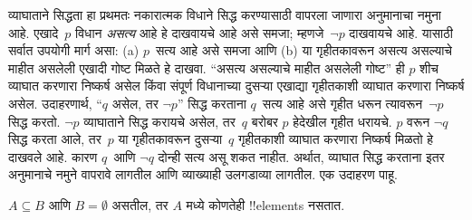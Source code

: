\documentclass[../../../include/open-logic-section]{subfiles}
\begin{document}


व्याघाताने सिद्धता हा प्रथमतः नकारात्मक विधाने सिद्ध करण्यासाठी वापरला जाणारा अनुमानाचा नमुना आहे. एखादे~$p$ विधान \emph{असत्य} आहे हे दाखवायचे आहे असे समजा; म्हणजे~$\lnot p$ दाखवायचे आहे. यासाठी सर्वात उपयोगी मार्ग असा: (a) $p$~सत्य आहे असे समजा आणि (b) या गृहीतकावरून असत्य असल्याचे माहीत असलेली एखादी गोष्ट मिळते हे दाखवा. “असत्य असल्याचे माहीत असलेली गोष्ट” ही $p$ शीच व्याघात करणारा निष्कर्ष असेल किंवा संपूर्ण विधानाच्या दुसऱ्या एखाद्या गृहीतकाशी व्याघात करणारा निष्कर्ष असेल. उदाहरणार्थ, “$q$ असेल, तर $\lnot p$” सिद्ध करताना $q$~सत्य आहे असे गृहीत धरून त्यावरून~$\lnot p$ सिद्ध करतो. $\lnot p$ व्याघाताने सिद्ध करायचे असेल, तर~$q$ बरोबर $p$ हेदेखील गृहीत धरायचे. $p$ वरून $\lnot q$ सिद्ध करता आले, तर~$p$ या गृहीतकावरून दुसऱ्या~$q$ गृहीतकाशी व्याघात करणारा निष्कर्ष मिळतो हे दाखवले आहे. कारण $q$~आणि $\lnot q$ दोन्ही सत्य असू शकत नाहीत. अर्थात, व्याघात सिद्ध करताना इतर अनुमानाचे नमुने वापरावे लागतील आणि व्याख्याही उलगडाव्या लागतील. एक उदाहरण पाहू.

\begin{prop}
$A \subseteq B$ आणि $B = \emptyset$ असतील, तर $A$ मध्ये कोणतेही !!{element}s नसतात.
\end{prop}
\end{document}
